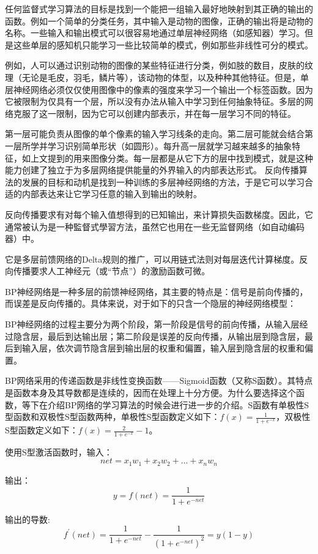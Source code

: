 \documentclass[UTF8]{ctexart}
\begin{document}
任何监督式学习算法的目标是找到一个能把一组输入最好地映射到其正确的输出的函数。例如一个简单的分类任务，其中输入是动物的图像，正确的输出将是动物的名称。一些输入和输出模式可以很容易地通过单层神经网络（如感知器）学习。但是这些单层的感知机只能学习一些比较简单的模式，例如那些非线性可分的模式。

例如，人可以通过识别动物的图像的某些特征进行分类，例如肢的数目，皮肤的纹理（无论是毛皮，羽毛，鳞片等），该动物的体型，以及种种其他特征。但是，单层神经网络必须仅仅使用图像中的像素的强度来学习一个输出一个标签函数。因为它被限制为仅具有一个层，所以没有办法从输入中学习到任何抽象特征。多层的网络克服了这一限制，因为它可以创建内部表示，并在每一层学习不同的特征。

第一层可能负责从图像的单个像素的输入学习线条的走向。第二层可能就会结合第一层所学并学习识别简单形状（如圆形）。每升高一层就学习越来越多的抽象特征，如上文提到的用来图像分类。每一层都是从它下方的层中找到模式，就是这种能力创建了独立于为多层网络提供能量的外界输入的内部表达形式。 反向传播算法的发展的目标和动机是找到一种训练的多层神经网络的方法，于是它可以学习合适的内部表达来让它学习任意的输入到输出的映射。

反向传播要求有对每个输入值想得到的已知输出，来计算损失函数梯度。因此，它通常被认为是一种監督式學習方法，虽然它也用在一些无监督网络（如自动编码器）中。

它是多层前馈网络的Delta规则的推广，可以用链式法则对每层迭代计算梯度。反向传播要求人工神经元（或“节点”）的激励函数可微。

BP神经网络是一种多层的前馈神经网络，其主要的特点是：信号是前向传播的，而误差是反向传播的。具体来说，对于如下的只含一个隐层的神经网络模型：

BP神经网络的过程主要分为两个阶段，第一阶段是信号的前向传播，从输入层经过隐含层，最后到达输出层；第二阶段是误差的反向传播，从输出层到隐含层，最后到输入层，依次调节隐含层到输出层的权重和偏置，输入层到隐含层的权重和偏置。

BP网络采用的传递函数是非线性变换函数——Sigmoid函数（又称S函数）。其特点是函数本身及其导数都是连续的，因而在处理上十分方便。为什么要选择这个函数，等下在介绍BP网络的学习算法的时候会进行进一步的介绍。S函数有单极性S型函数和双极性S型函数两种，单极性S型函数定义如下：$f(x)=\frac{1}{1+e^{−x}}$，双极性S型函数定义如下：$f(x)=\frac{2}{1+e^{−x}}-1$。

使用S型激活函数时，输入：$$net=x_1w_1+x_2w_2+...+x_nw_n$$

输出：$$ y=f(net)=\frac{1}{1+e^{-net}}$$
    
输出的导数:$$f^{'}(net)=\frac{1}{1+e^{-net}}-\frac{1}{(1+e^{-net})^2}=y(1-y)$$
\end{document}
